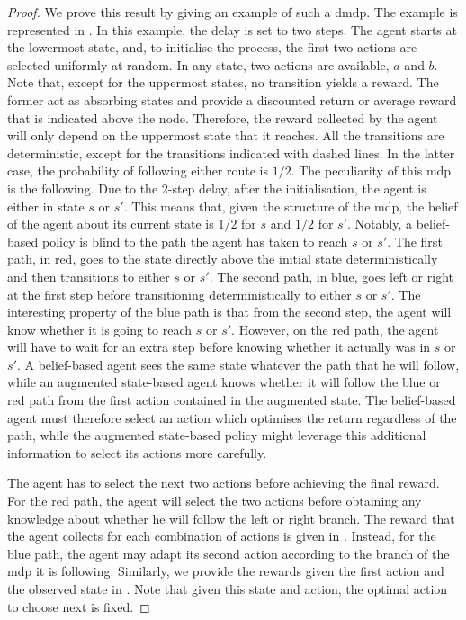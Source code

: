 \begin{proof}
    We prove this result by giving an example of such a \gls{dmdp}.
    The example is represented in . 
    In this example, the delay is set to two steps. The agent starts at the lowermost state, and, to initialise the process, the first two actions are selected uniformly at random. In any state, two actions are available, $a$ and $b$. 
    Note that, except for the uppermost states, no transition yields a reward. 
    The former act as absorbing states and provide a discounted return or average reward that is indicated above the node.
    Therefore, the reward collected by the agent will only depend on the uppermost state that it reaches.
    All the transitions are deterministic, except for the transitions indicated with dashed lines. 
    In the latter case, the probability of following either route is $1/2$.
    The peculiarity of this \gls{mdp} is the following. 
    Due to the 2-step delay, after the initialisation, the agent is either in state $s$ or $s'$.
    This means that, given the structure of the \gls{mdp}, the belief of the agent about its current state is $1/2$ for $s$ and $1/2$ for $s'$.
    Notably, a belief-based policy is blind to the path the agent has taken to reach $s$ or $s'$.
    The first path, in red, goes to the state directly above the initial state deterministically and then transitions to either $s$ or $s'$. 
    The second path, in blue, goes left or right at the first step before transitioning deterministically to either $s$ or $s'$. 
    The interesting property of the blue path is that from the second step, the agent will know whether it is going to reach $s$ or $s'$. 
    However, on the red path, the agent will have to wait for an extra step before knowing whether it actually was in $s$ or $s'$.
    A belief-based agent sees the same state whatever the path that he will follow, while an augmented state-based agent knows whether it will follow the blue or red path from the first action contained in the augmented state.
    The belief-based agent must therefore select an action which optimises the return regardless of the path, while the augmented state-based policy might leverage this additional information to select its actions more carefully. 
    
    The agent has to select the next two actions before achieving the final reward. 
    For the red path, the agent will select the two actions before obtaining any knowledge about whether he will follow the left or right branch. 
    The reward that the agent collects for each combination of actions is given in . 
    Instead, for the blue path, the agent may adapt its second action according to the branch of the \gls{mdp} it is following. 
    Similarly, we provide the rewards given the first action and the observed state in . 
    Note that given this state and action, the optimal action to choose next is fixed. 
    

\end{proof}
